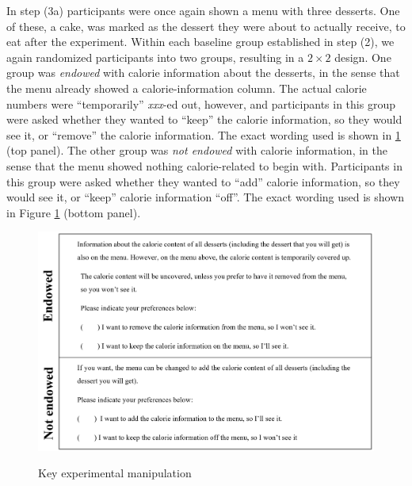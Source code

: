 \documentclass[12pt]{article}
\begin{document}
In step (3a) participants were once again shown a menu with three desserts. One of these, a cake, was marked as the dessert they were about to actually receive, to eat after the experiment. Within each baseline group established in step (2), we again randomized participants into two groups, resulting in a $2 \times 2$ design. One group was \emph{endowed} with calorie information about the desserts, in the sense that the menu already showed a calorie-information column. The actual calorie numbers were \enquote{temporarily} \emph{xxx}-ed out, however, and participants in this group were asked whether they wanted to \enquote{keep} the calorie information, so they would see it, or \enquote{remove} the calorie information. The exact wording used is shown in \ref{fig:expManipulation} (top panel). The other group was \emph{not endowed} with calorie information, in the sense that the menu showed nothing calorie-related to begin with. Participants in this group were asked whether they wanted to \enquote{add} calorie information, so they would see it, or \enquote{keep} calorie information \enquote{off}. The exact wording used is shown in Figure  \ref{fig:expManipulation} (bottom panel).

\begin{figure}[ht]
  \caption{Key experimental manipulation}\label{fig:expManipulation}
  \begin{center}
  {\includegraphics[width=1\textwidth]{./figures/keyManipulation.png}}
  \end{center}
\end{figure}
\end{document}
